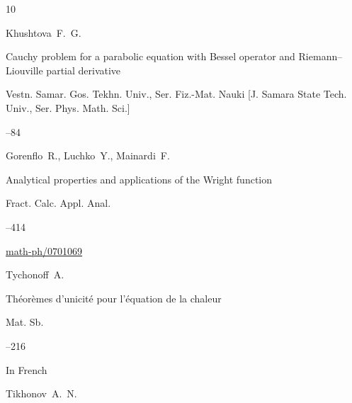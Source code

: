 \begin{thebibliography}{10}

\by Khushtova~F.~G.

\paper Cauchy problem for a parabolic equation with Bessel operator and Riemann--Liouville partial derivative

\jour Vestn. Samar. Gos. Tekhn. Univ., Ser. Fiz.-Mat. Nauki \rm [J. Samara State Tech. Univ., Ser. Phys. Math. Sci.]




--84







\by Gorenflo~R., Luchko~Y., Mainardi~F.

\paper Analytical properties and applications of the Wright  function

\jour Fract. Calc. Appl. Anal.




--414

\arxiv \href{https://arxiv.org/abs/math-ph/0701069}{math-ph/0701069}








\by Tychonoff~A.

\paper Th\'eor\`emes d'unicit\'e pour l'\'equation de la chaleur

\jour Mat. Sb.




--216

\lang In French












\by Tikhonov~A.~N.


\end{thebibliography}
